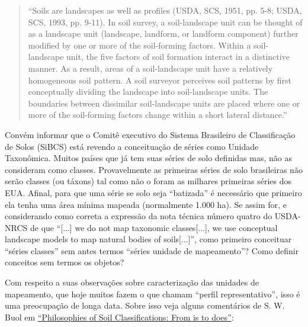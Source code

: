 \begin{quotation}
  ``Soils are landscapes as well as profiles (USDA, SCS, 1951, pp. 5-8; USDA, SCS, 1993, pp. 9-11). In soil survey, a soil-landscape unit can be thought of as a landscape unit (landscape, landform, or landform component) further modified by one or more of the soil-forming factors. Within a soil-landscape unit, the five factors of soil formation interact in a distinctive manner. As a result, areas of a soil-landscape unit have a relatively homogeneous soil pattern. A soil surveyor perceives soil patterns by first conceptually dividing the landscape into soil-landscape units. The boundaries between dissimilar soil-landscape units are placed where one or more of the soil-forming factors change within a short lateral distance.''
\end{quotation}

Convém informar que o Comitê executivo do Sistema Brasileiro de Classificação de Solos (SiBCS) está revendo a conceituação de séries como Unidade Taxonômica. Muitos países que já tem suas séries de solo definidas mas, não as consideram como classes. Provavelmente as primeiras séries de solo brasileiras não serão classes (ou táxons) tal como não o foram as milhares primeiras séries dos EUA. Afinal, para que uma série se solo seja ``batizada'' é necessário que primeiro ela tenha uma área mínima mapeada (normalmente 1.000 ha). Se assim for, e considerando como correta a expressão da nota técnica número quatro do USDA-NRCS de que ``[...] we do not map taxonomic classes[...], we use conceptual landscape models to map natural bodies of soils[...]'', como primeiro conceituar ``séries classes'' sem antes termos ``séries unidade de mapeamento''? Como definir conceitos sem termos os objetos?

Com respeito a suas observações sobre caracterização das unidades de mapeamento, que hoje muitos fazem o que chamam ``perfil representativo'', isso é uma preocupação de longa data. Sobre isso veja alguns comentários de S. W. Buol em \href{http://base.dnsgb.com.ua/files/book/Agriculture/Soil/Soil-Classification.pdf}{``Philosophies of Soil Classifications: From is to does''}:

